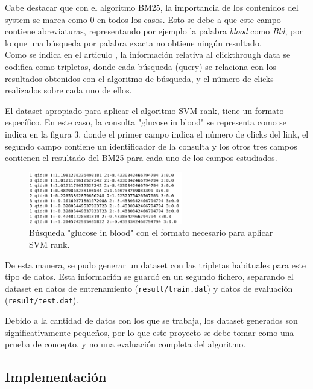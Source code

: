 \documentclass[a4paper,12pt]{article}
\begin{document}
	Cabe destacar que con el algoritmo BM25, la importancia de los contenidos del system se marca como $0$ en todos los casos. Esto se debe a que este campo contiene abreviaturas, representando por ejemplo la palabra \textit{blood} como \textit{Bld}, por lo que una búsqueda por palabra exacta no obtiene ningún resultado.\\
	
	Como se indica en el articulo \cite{articulo-clase}, la información relativa al clickthrough data se codifica como tripletas, donde cada búsqueda (query) se relaciona con los resultados obtenidos con el algoritmo de búsqueda, y el número de clicks realizados sobre cada uno de ellos.
	
	
	El dataset apropiado para aplicar el algoritmo SVM rank, tiene un formato específico. En este caso, la consulta "glucose in blood" se representa como se indica en la figura 3, donde el primer campo indica el número de clicks del link, el segundo campo contiene un identificador de la consulta y los otros tres campos contienen el resultado del BM25 para cada uno de los campos estudiados.
	
	\begin{figure}[H]
		\centering
		\includegraphics[width=0.6\textwidth]{include/SVMinput_glucoseBlood.png}
		\caption{Búsqueda "glucose in blood" con el formato necesario para aplicar SVM rank.}
	\end{figure}
	
	De esta manera, se pudo generar un dataset con las tripletas habituales para este tipo de datos. Esta información se guardó en un segundo fichero, separando el dataset en datos de entrenamiento (\texttt{result/train.dat}) y datos de evaluación (\texttt{result/test.dat}).
	
	Debido a la cantidad de datos con los que se trabaja, los dataset generados son significativamente pequeños, por lo que este proyecto se debe tomar como una prueba de concepto, y no una evaluación completa del algoritmo.
	
	\subsection{Implementación}
	
\end{document}
